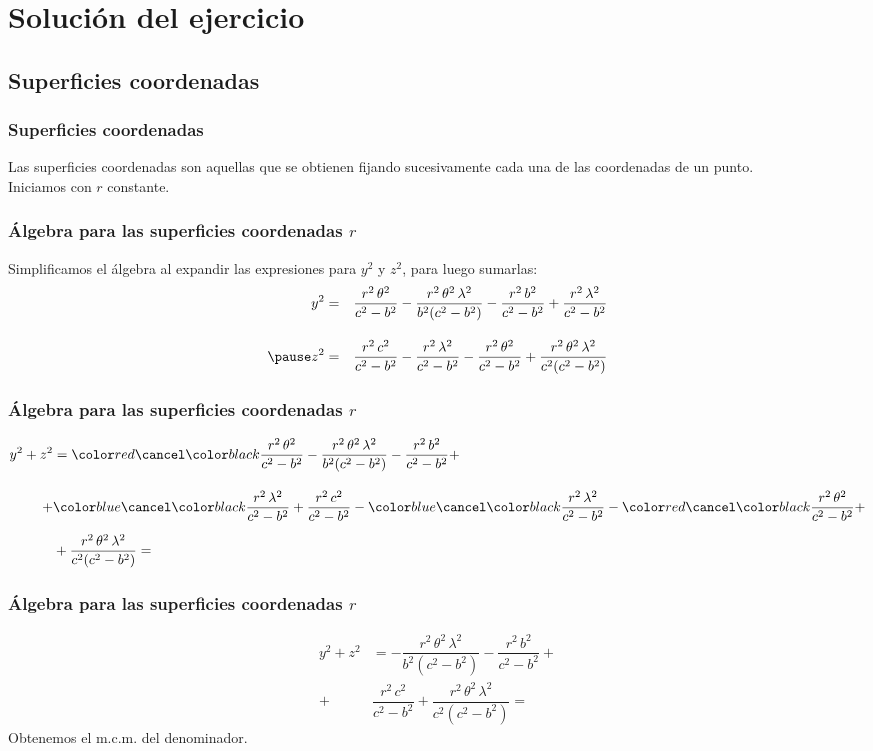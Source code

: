 \section{Solución del ejercicio}
\subsection{Superficies coordenadas}

\begin{frame}
\frametitle{Superficies coordenadas}
Las superficies coordenadas son aquellas que se obtienen fijando sucesivamente cada una de las coordenadas de un punto.
\\
\bigskip
\pause
Iniciamos con $r$ constante.
\end{frame}
\begin{frame}
\frametitle{Álgebra para las superficies coordenadas $r$}
Simplificamos el álgebra al expandir las expresiones para $y^{2}$ y $z^{2}$, para luego sumarlas:
\pause
\begin{eqnarray*}
y^{2} &=& \dfrac{r^{2} \, \theta^{2}}{c^{2} - b^{2}} - \dfrac{r^{2} \, \theta^{2} \, \lambda^{2}}{b^{2}(c^{2} - b^{2})} - \dfrac{r^{2} \, b^{2}}{c^{2} - b^{2}} + \dfrac{r^{2} \, \lambda^{2}}{c^{2} - b^{2}} \\[1em] \pause
z^{2} &=& \dfrac{r^{2} \, c^{2}}{c^{2} - b^{2}} - \dfrac{r^{2} \, \lambda^{2}}{c^{2} - b^{2}} - \dfrac{r^{2} \, \theta^{2}}{c^{2} - b^{2}} + \dfrac{r^{2} \, \theta^{2} \, \lambda^{2}}{c^{2} (c^{2} - b^{2})}
\end{eqnarray*}
\end{frame}
\begin{frame}
\frametitle{Álgebra para las superficies coordenadas $r$}
\begin{align*}
y^{2} + z^{2} &= \Cancel[red]{\dfrac{r^{2} \, \theta^{2}}{c^{2} - b^{2}}} - \dfrac{r^{2} \, \theta^{2} \, \lambda^{2}}{b^{2}(c^{2} - b^{2})} - \dfrac{r^{2} \, b^{2}}{c^{2} - b^{2}} + \\[1em]
+& \Cancel[blue]{\dfrac{r^{2} \, \lambda^{2}}{c^{2} - b^{2}}} + \dfrac{r^{2} \, c^{2}}{c^{2} - b^{2}} - \Cancel[blue]{\dfrac{r^{2} \, \lambda^{2}}{c^{2} - b^{2}}} - \Cancel[red]{\dfrac{r^{2} \, \theta^{2}}{c^{2} - b^{2}}} + \\[0.5em]
&+ \dfrac{r^{2} \, \theta^{2} \, \lambda^{2}}{c^{2} (c^{2} - b^{2})} =
\end{align*}
\end{frame}
\begin{frame}
\frametitle{Álgebra para las superficies coordenadas $r$}
\begin{align*}
y^{2} + z^{2} &= - \dfrac{r^{2} \, \theta^{2} \, \lambda^{2}}{b^{2}(c^{2} - b^{2})} - \dfrac{r^{2} \, b^{2}}{c^{2} - b^{2}} + \\[1em]
+& \dfrac{r^{2} \, c^{2}}{c^{2} - b^{2}} + \dfrac{r^{2} \, \theta^{2} \, \lambda^{2}}{c^{2} (c^{2} - b^{2})} =
\end{align*}
\pause
Obtenemos el m.c.m. del denominador.
\end{frame}
